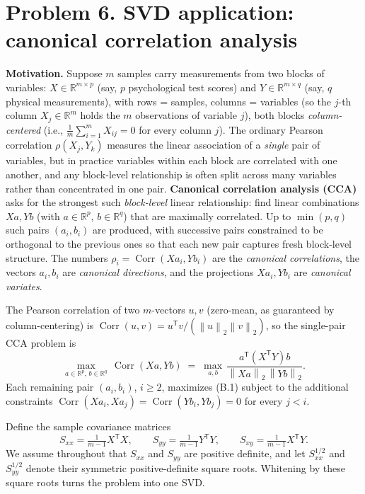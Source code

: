 \documentclass[11pt]{article}
\newcommand{\R}{\mathbb{R}}
\newcommand{\norm}[1]{\left\lVert #1\right\rVert}
\newcommand{\T}{^{\mathsf T}}
\begin{document}
\section*{Problem 6. SVD application: canonical correlation analysis}

\textbf{Motivation.} Suppose $m$ samples carry measurements from two
blocks of variables: $X\in\R^{m\times p}$ (say, $p$ psychological test
scores) and $Y\in\R^{m\times q}$ (say, $q$ physical measurements), with
rows = samples, columns = variables (so the $j$-th column $X_j\in\R^m$
holds the $m$ observations of variable $j$), both blocks
\emph{column-centered} (i.e., $\frac{1}{m}\sum_{i=1}^m X_{ij}=0$ for
every column $j$). The ordinary Pearson correlation $\rho(X_j, Y_k)$
measures the linear association of a \emph{single} pair of variables,
but in practice variables within each block are correlated with one
another, and any block-level relationship is often split across many
variables rather than concentrated in one pair. \textbf{Canonical
correlation analysis (CCA)} asks for the strongest such
\emph{block-level} linear relationship: find linear combinations
$Xa, Yb$ (with $a\in\R^p$, $b\in\R^q$) that are maximally correlated.
Up to $\min(p, q)$ such pairs $(a_i, b_i)$ are produced, with
successive pairs constrained to be orthogonal to the previous ones so
that each new pair captures fresh block-level structure. The numbers
$\rho_i=\operatorname{Corr}(X a_i, Y b_i)$ are the \emph{canonical
correlations}, the vectors $a_i, b_i$ are \emph{canonical directions},
and the projections $X a_i, Y b_i$ are \emph{canonical variates}.

The Pearson correlation of two $m$-vectors $u, v$ (zero-mean, as
guaranteed by column-centering) is
$\operatorname{Corr}(u, v) = u\T v / (\norm{u}_2 \norm{v}_2)$, so the
single-pair CCA problem is
\[
 \max_{a\in\R^p,\, b\in\R^q}\, \operatorname{Corr}(Xa, Yb)
 \;=\; \max_{a, b}\, \frac{a\T (X\T Y) b}{\norm{Xa}_2\, \norm{Yb}_2}.
 \tag{B.1}
\]
Each remaining pair $(a_i, b_i)$, $i\ge 2$, maximizes (B.1) subject
to the additional constraints
$\operatorname{Corr}(X a_i, X a_j) = \operatorname{Corr}(Y b_i, Y b_j) = 0$
for every $j<i$.

Define the sample covariance matrices
\[
S_{xx}=\tfrac{1}{m-1}X\T X,\qquad
S_{yy}=\tfrac{1}{m-1}Y\T Y,\qquad
S_{xy}=\tfrac{1}{m-1}X\T Y.
\]
We assume throughout that $S_{xx}$ and $S_{yy}$ are positive definite,
and let $S_{xx}^{1/2}$ and $S_{yy}^{1/2}$ denote their symmetric
positive-definite square roots. Whitening by these square roots turns
the problem into one SVD.
\end{document}

